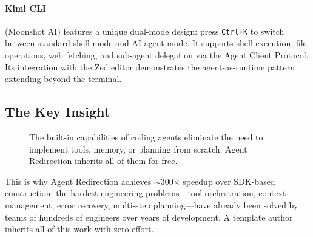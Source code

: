 \paragraph{Kimi CLI} (Moonshot AI) features a unique dual-mode design: press \texttt{Ctrl+K} to switch between standard shell mode and AI agent mode. It supports shell execution, file operations, web fetching, and sub-agent delegation via the Agent Client Protocol. Its integration with the Zed editor demonstrates the agent-as-runtime pattern extending beyond the terminal.

\subsection{The Key Insight}

\begin{figure}[ht]
\centering
{}
\caption{The built-in capabilities of coding agents eliminate the need to implement tools, memory, or planning from scratch. Agent Redirection inherits all of them for free.}
\label{fig:key-insight}
\end{figure}

This is why Agent Redirection achieves $\sim$300$\times$ speedup over SDK-based construction: the hardest engineering problems---tool orchestration, context management, error recovery, multi-step planning---have already been solved by teams of hundreds of engineers over years of development. A template author inherits all of this work with zero effort.
